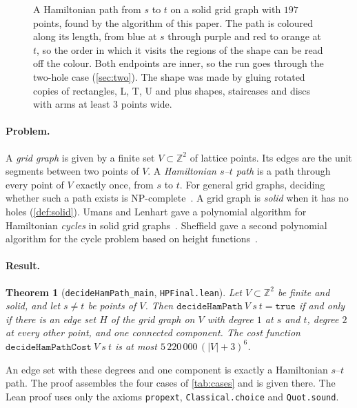 \documentclass[11pt]{article}
\theoremstyle{plain}
\newtheorem{theorem}{Theorem}[section]
\theoremstyle{definition}
\theoremstyle{remark}
\newcommand{\Z}{\mathbb{Z}}
\newcommand{\lean}[1]{\texttt{#1}}
\begin{document}
\begin{figure}[t]
\centering

\caption{A Hamiltonian path from $s$ to $t$ on a solid grid graph with $197$ points, found by the
algorithm of this paper.
The path is coloured along its length, from blue at $s$ through purple and red to orange at $t$, so
the order in which it visits the regions of the shape can be read off the colour.
Both endpoints are inner, so the run goes through the two-hole case (\cref{sec:two}).
The shape was made by gluing rotated copies
of rectangles, L, T, U and plus shapes, staircases and discs with arms at least $3$ points wide.}
\label{fig:hero}
\end{figure}

\paragraph{Problem.}
A \emph{grid graph} is given by a finite set $V\subset\Z^2$ of lattice points.
Its edges are the unit segments between two points of $V$.
A \emph{Hamiltonian $s$--$t$ path} is a path through every point of $V$ exactly once, from $s$ to $t$.
For general grid graphs, deciding whether such a path exists is NP-complete~\cite{itai1982}.
A grid graph is \emph{solid} when it has no holes (\cref{def:solid}).
Umans and Lenhart gave a polynomial algorithm for Hamiltonian \emph{cycles} in solid grid
graphs~\cite{umans1997}.
Sheffield gave a second polynomial algorithm for the cycle problem based on height
functions~\cite{sheffield2000}.

\paragraph{Result.}
\begin{theorem}[\lean{decideHamPath\_main}, \lean{HPFinal.lean}]
\label{thm:main}
Let $V\subset\Z^2$ be finite and solid, and let $s\neq t$ be points of $V$.
Then $\lean{decideHamPath}\ V\ s\ t=\lean{true}$ if and only if there is an edge set $H$ of the grid graph
on $V$ with degree $1$ at $s$ and $t$, degree $2$ at every other point, and one connected component.
The cost function $\lean{decideHamPathCost}\ V\ s\ t$ is at most $5\,220\,000\,(|V|+3)^6$.
\end{theorem}

An edge set with these degrees and one component is exactly a Hamiltonian $s$--$t$ path.
The proof assembles the four cases of \cref{tab:cases} and is given there.
The Lean proof uses only the axioms \lean{propext}, \lean{Classical.choice} and \lean{Quot.sound}.
\end{document}
